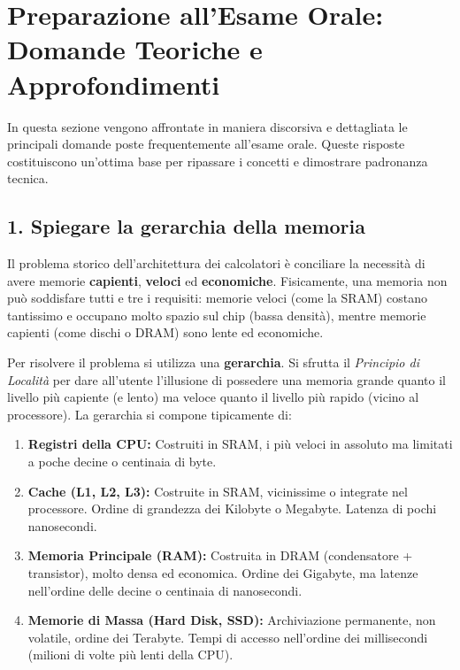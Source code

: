 \documentclass[12pt, a4paper]{article}
\begin{document}
\newpage


\section{Preparazione all'Esame Orale: Domande Teoriche e Approfondimenti}

In questa sezione vengono affrontate in maniera discorsiva e dettagliata le principali domande poste frequentemente all'esame orale. Queste risposte costituiscono un'ottima base per ripassare i concetti e dimostrare padronanza tecnica.

\subsection{1. Spiegare la gerarchia della memoria}
Il problema storico dell'architettura dei calcolatori è conciliare la necessità di avere memorie \textbf{capienti}, \textbf{veloci} ed \textbf{economiche}. Fisicamente, una memoria non può soddisfare tutti e tre i requisiti: memorie veloci (come la SRAM) costano tantissimo e occupano molto spazio sul chip (bassa densità), mentre memorie capienti (come dischi o DRAM) sono lente ed economiche. 

Per risolvere il problema si utilizza una \textbf{gerarchia}. Si sfrutta il \textit{Principio di Località} per dare all'utente l'illusione di possedere una memoria grande quanto il livello più capiente (e lento) ma veloce quanto il livello più rapido (vicino al processore).
La gerarchia si compone tipicamente di:

\begin{enumerate}
    \item \textbf{Registri della CPU:} Costruiti in SRAM, i più veloci in assoluto ma limitati a poche decine o centinaia di byte.
    \item \textbf{Cache (L1, L2, L3):} Costruite in SRAM, vicinissime o integrate nel processore. Ordine di grandezza dei Kilobyte o Megabyte. Latenza di pochi nanosecondi.
    \item \textbf{Memoria Principale (RAM):} Costruita in DRAM (condensatore + transistor), molto densa ed economica. Ordine dei Gigabyte, ma latenze nell'ordine delle decine o centinaia di nanosecondi.
    \item \textbf{Memorie di Massa (Hard Disk, SSD):} Archiviazione permanente, non volatile, ordine dei Terabyte. Tempi di accesso nell'ordine dei millisecondi (milioni di volte più lenti della CPU).
\end{enumerate}
\end{document}
